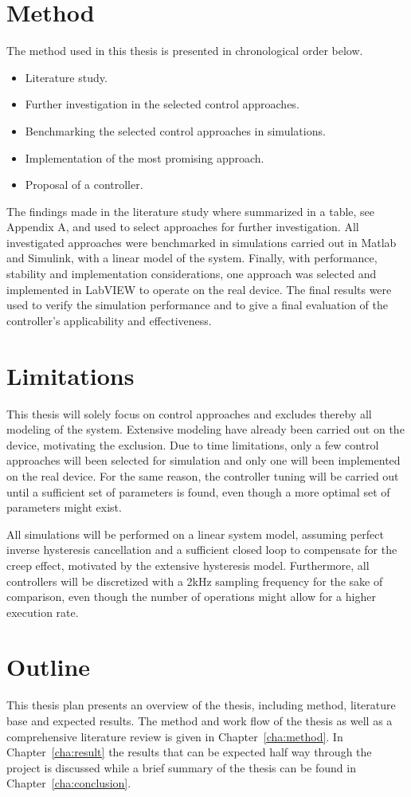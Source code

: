 \section{Method}
The method used in this thesis is presented in chronological order below.

\begin{itemize}
  \item Literature study.
  \item Further investigation in the selected control approaches.
  \item Benchmarking the selected control approaches in simulations.
  \item Implementation of the most promising approach.
  \item Proposal of a controller.
\end{itemize}

The findings made in the literature study where summarized in a table, see Appendix A, and used to select approaches for further investigation.
All investigated approaches were benchmarked in simulations carried out in Matlab and Simulink, with a linear model of the system. Finally, with performance, stability and implementation considerations, one approach was selected and implemented in LabVIEW to operate on the real device. The final results were used to verify the simulation performance and to give a final evaluation of the controller's applicability and effectiveness.

\section{Limitations}
This thesis will solely focus on control approaches and excludes thereby all modeling of the system. Extensive modeling have already been carried out on the device, motivating the exclusion. Due to time limitations, only a few control approaches will been selected for simulation and only one will been implemented on the real device. For the same reason, the controller tuning will be carried out until a sufficient set of parameters is found, even though a more optimal set of parameters might exist.

All simulations will be performed on a linear system model, assuming perfect inverse hysteresis cancellation and a sufficient closed loop to compensate for the creep effect, motivated by the extensive hysteresis model. Furthermore, all controllers will be discretized with a 2kHz sampling frequency for the sake of comparison, even though the number of operations might allow for a higher execution rate.

\section{Outline}
This thesis plan presents an overview of the thesis, including method, literature base and expected results. The method and work flow of the thesis as well as a comprehensive literature review is given in Chapter~\ref{cha:method}. In Chapter~\ref{cha:result} the results that can be expected half way through the project is discussed while a brief summary of the thesis can be found in Chapter~\ref{cha:conclusion}.
